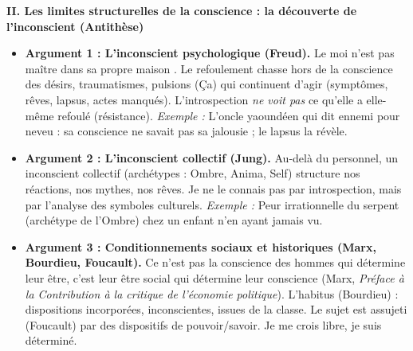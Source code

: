 \documentclass[11pt]{article}
\newcommand{\cle}[1]{{\popxbold\color{popdark}#1}}
\begin{document}
\begin{corrige}
\textbf{II. Les limites structurelles de la conscience : la découverte de l'inconscient (Antithèse)}
\begin{itemize}
\item \textbf{Argument 1 : L'inconscient psychologique (Freud).} \guillemotleft Le moi n'est pas maître dans sa propre maison \guillemotright. Le \cle{refoulement} chasse hors de la conscience des désirs, traumatismes, pulsions (Ça) qui continuent d'agir (symptômes, rêves, lapsus, actes manqués). L'introspection \emph{ne voit pas} ce qu'elle a elle-même refoulé (résistance). \textit{Exemple :} L'oncle yaoundéen qui dit \guillemotleft ennemi \guillemotright pour \guillemotleft neveu \guillemotright : sa conscience ne savait pas sa jalousie ; le lapsus la révèle.
\item \textbf{Argument 2 : L'inconscient collectif (Jung).} Au-delà du personnel, un \cle{inconscient collectif} (archétypes : Ombre, Anima, Self) structure nos réactions, nos mythes, nos rêves. Je ne le connais pas par introspection, mais par l'analyse des symboles culturels. \textit{Exemple :} Peur irrationnelle du serpent (archétype de l'Ombre) chez un enfant n'en ayant jamais vu.
\item \textbf{Argument 3 : Conditionnements sociaux et historiques (Marx, Bourdieu, Foucault).} \guillemotleft Ce n'est pas la conscience des hommes qui détermine leur être, c'est leur être social qui détermine leur conscience \guillemotright (Marx, \emph{Préface à la Contribution à la critique de l'économie politique}). L'\cle{habitus} (Bourdieu) : dispositions incorporées, inconscientes, issues de la classe. Le \cle{sujet} est \guillemotleft assujeti \guillemotright (Foucault) par des dispositifs de pouvoir/savoir. Je me crois libre, je suis déterminé.
\end{itemize}


\end{corrige}
\end{document}
